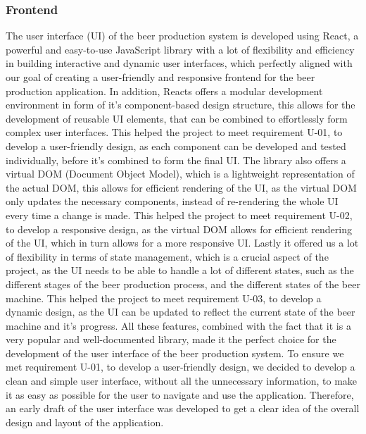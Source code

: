 \subsubsection{Frontend}
The user interface (UI) of the beer production system is developed using React, a powerful and easy-to-use JavaScript library with a lot of flexibility and efficiency in building interactive and dynamic user interfaces, which perfectly aligned with our goal of creating a user-friendly and responsive frontend for the beer production application.
In addition, Reacts offers a modular development environment in form of it's component-based design structure, this allows for the development of reusable UI elements, that can be combined to effortlessly form complex user interfaces. This helped the project to meet requirement U-01, to develop a user-friendly design, as each component can be developed and tested individually, before it's combined to form the final UI. \newline
The library also offers a virtual DOM (Document Object Model), which is a lightweight representation of the actual DOM, this allows for efficient rendering of the UI, as the virtual DOM only updates the necessary components, instead of re-rendering the whole UI every time a change is made. This helped the project to meet requirement U-02, to develop a responsive design, as the virtual DOM allows for efficient rendering of the UI, which in turn allows for a more responsive UI. \newline
Lastly it offered us a lot of flexibility in terms of state management, which is a crucial aspect of the project, as the UI needs to be able to handle a lot of different states, such as the different stages of the beer production process, and the different states of the beer machine. This helped the project to meet requirement U-03, to develop a dynamic design, as the UI can be updated to reflect the current state of the beer machine and it's progress. \newline
All these features, combined with the fact that it is a very popular and well-documented library, made it the perfect choice for the development of the user interface of the beer production system.
To ensure we met requirement U-01, to develop a user-friendly design, we decided to develop a clean and simple user interface, without all the unnecessary information, to make it as easy as possible for the user to navigate and use the application. \newline
Therefore, an early draft of the user interface was developed to get a clear idea of the overall design and layout of the application. \newline
